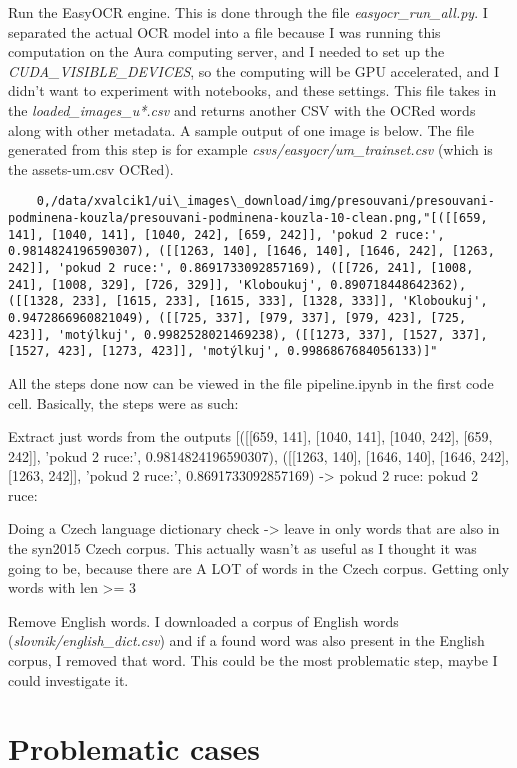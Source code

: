 \documentclass[
  digital,     %
  oneside,     %
  nosansbold,  %
  nocolorbold, %
  nolof,         %
  nolot,         %
]{fithesis4}
\begin{document}
Run the EasyOCR engine. This is done through the file \emph{easyocr\_run\_all.py}. I separated the actual OCR model into a file because I was running this computation on the Aura computing server, and I needed to set up the \emph{CUDA\_VISIBLE\_DEVICES}, so the computing will be GPU accelerated, and I didn't want to experiment with notebooks, and these settings. This file takes in the \emph{loaded\_images\_u*.csv} and returns another CSV with the OCRed words along with other metadata. A sample output of one image is below. The file generated from this step is for example \emph{csvs/easyocr/um\_trainset.csv} (which is the assets-um.csv OCRed).

\begin{verbatim}
    0,/data/xvalcik1/ui\_images\_download/img/presouvani/presouvani-podminena-kouzla/presouvani-podminena-kouzla-10-clean.png,"[([[659, 141], [1040, 141], [1040, 242], [659, 242]], 'pokud 2 ruce:', 0.9814824196590307), ([[1263, 140], [1646, 140], [1646, 242], [1263, 242]], 'pokud 2 ruce:', 0.8691733092857169), ([[726, 241], [1008, 241], [1008, 329], [726, 329]], 'Kloboukuj', 0.890718448642362), ([[1328, 233], [1615, 233], [1615, 333], [1328, 333]], 'Kloboukuj', 0.9472866960821049), ([[725, 337], [979, 337], [979, 423], [725, 423]], 'motýlkuj', 0.9982528021469238), ([[1273, 337], [1527, 337], [1527, 423], [1273, 423]], 'motýlkuj', 0.9986867684056133)]"
\end{verbatim}




All the steps done now can be viewed in the file pipeline.ipynb in the first code cell. Basically, the steps were as such:

Extract just words from the outputs [([[659, 141], [1040, 141], [1040, 242], [659, 242]], 'pokud 2 ruce:', 0.9814824196590307), ([[1263, 140], [1646, 140], [1646, 242], [1263, 242]], 'pokud 2 ruce:', 0.8691733092857169) -> pokud 2 ruce: pokud 2 ruce:

Doing a Czech language dictionary check -> leave in only words that are also in the syn2015 Czech corpus. This actually wasn't as useful as I thought it was going to be, because there are A LOT of words in the Czech corpus.
Getting only words with len >= 3

Remove English words. I downloaded a corpus of English words (\emph{slovnik/english\_dict.csv}) and if a found word was also present in the English corpus, I removed that word. This could be the most problematic step, maybe I could investigate it.

\section{Problematic cases}
\end{document}
